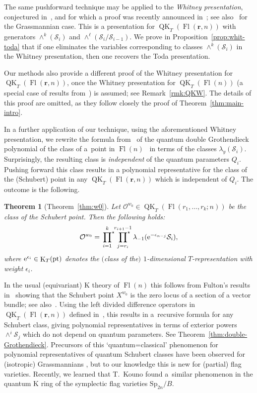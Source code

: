 \documentclass[pdftex]{sigma}
\numberwithin{equation}{section}
\newtheorem{Theorem}{Theorem}[section]
\theoremstyle{definition}
\DeclareMathOperator{\Fl}{Fl}
\DeclareMathOperator{\QK}{QK}
\DeclareMathOperator{\K}{K}
\DeclareMathOperator{\pt}{pt}
\newcommand{\bfr}{{\mathbf r}}
\newcommand{\cO}{{\mathcal O}}
\newcommand{\cS}{{\mathcal S}}
\begin{document}
The same pushforward technique may be applied to the {\em Whitney presentation},
conjectured in~\cite{gu2023quantum,GMSXZZ:QKW}, and for which a proof was recently announced in~\cite{huq2024quantum}; see also~\cite{Gu:2020zpg,gu2022quantum} for the Grassmannian case.
This is a presentation for $\QK_T(\Fl(\bfr,n))$ with generators $\wedge^k(\cS_i)$ and $\wedge^\ell(
 \cS_i/\cS_{i-1}
)$. We prove in Proposition~\ref{prop:whit-toda} that if one eliminates the variables corresponding to
classes $\wedge^k(\cS_i)$ in the Whitney presentation,
then one recovers the Toda presentation.

Our methods also provide a different proof of the Whitney
presentation for $\QK_T(\Fl(\bfr,n))$, once the Whitney
presentation for $\QK_T(\Fl(n))$ (a special case of results from~\cite{huq2024quantum})
is assumed; see Remark~\ref{rmk:QKW}. The details of this proof are omitted, as
they follow closely the proof of Theorem~\ref{thm:main-intro}.

In a further application of our technique, using the aforementioned
Whitney presentation, we rewrite the formula
from~\cite{maeno2023presentation}
of the quantum double Grothendieck
polynomial of the class of a~point in $\Fl(n)$~\cite{maeno2023presentation} in terms
of the classes $\lambda_y(\cS_i)$.
Surprisingly, the resulting class is {\em independent}
of the quantum parameters $Q_i$.
Pushing forward this class results in a polynomial representative
for the class of the (Schubert) point in any $\QK_T(\Fl(\bfr,n))$
which is independent of $Q_i$. The outcome is the following.

\begin{Theorem}[Theorem~\ref{thm:w0}]%
Let $\cO^{w_0} \in \QK_T(\Fl(r_1,\dots, r_k;n))$ be the class of the Schubert point.
Then the following holds:
 \begin{gather*}
 \cO^{w_0}=\sideset{}{^\star}\prod_{i=1}^{k}\sideset{}{^\star}\prod_{j=r_i}^{r_{i+1}-1}\lambda_{-1}({\rm e}^{-\epsilon_{n-j}}\cS_i) ,
 \end{gather*}
where ${\rm e}^{\epsilon_i} \in \K_T(\pt)$ denotes the $($class of the$)$ $1$-dimensional $T$-representation
with weight $\epsilon_i$.
\end{Theorem}

In the usual (equivariant) K theory of $\Fl(n)$ this follows from Fulton's results in~\cite{fulton:flags}
showing that the Schubert point $X^{w_0}$ is the zero locus of a section of a vector bundle;
see also~\cite[Theorem~3]{fulton.lascoux}.
Using the left divided difference
operators in $\QK_T(\Fl(\bfr,n))$ defined in~\cite{Mihalcea2022Left},
this results in a~recursive formula for any Schubert class, giving
polynomial representatives in terms of exterior
powers $\wedge^i \cS_j$ which do not depend on quantum parameters.
See Theorem~\ref{thm:double-Grothendieck}.
Precursors of this `quantum=classical' phenomenon for polynomial representatives
of quantum Schubert classes have been observed for (isotropic) Grassmannians
\cite{bertram:quantum,BCFF,Gorbounov:2014,IMN:factorial,mihalcea:giambelli}, but to our knowledge this is new for
(partial) flag varieties. Recently, we learned that T.~Kouno found a~similar phenomenon
in the quantum K ring of the symplectic flag varieties $\mathrm{Sp}_{2n}/B$.
\end{document}
